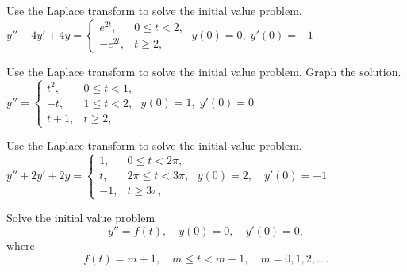 \documentclass{ximera}
\begin{document}
\begin{problem}\label{exer:8.5.18} Use the Laplace transform to solve the initial value problem.
$y''-4y'+4y=\left\{\begin{array}{rl}
e^{2t},&0\le t<2,\\-e^{2t},&t\ge 2,\end{array}\right.\;  y(0)=0,\;
y'(0)=-1$
\end{problem}

\begin{problem}\label{exer:8.5.19} Use the Laplace transform to solve the initial value problem.  Graph the solution. 
$y''=\left\{\begin{array}{cl}t^2,&0\le
t<1,\\-t,&1\le t<2,\\t+1,&t\ge 2,\end{array}\right.\;  y(0)=1,\;
y'(0)=0$
\end{problem}

\begin{problem}\label{exer:8.5.20} Use the Laplace transform to solve the initial value problem.
$y''+2y'+2y=\left\{\begin{array}{rl}1,&0\le
t<2\pi,\\t,&2\pi\le t<3\pi,\\-1,&t\ge 3\pi,\end{array}\right.\;
y(0)=2,\quad y'(0)=-1$
\end{problem}

\begin{problem}\label{exer:8.5.21} Solve the initial value problem $$ y''=f(t), \quad
y(0)=0,\quad  y'(0)=0, $$ where $$ f(t)=m+1,\quad m\le t<m+1,\quad
m=0,1,2,\dots. $$
\end{problem}
\end{document}
